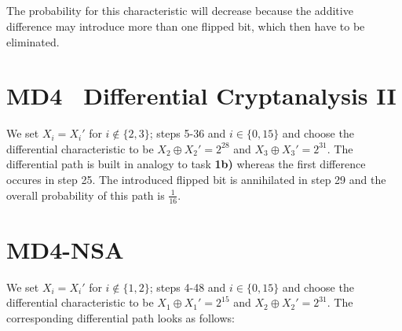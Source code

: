 \subsection{}
The probability for this characteristic will decrease because the additive difference may introduce more than one flipped bit, which then have to be eliminated.

\section{MD4 \textendash\ Differential Cryptanalysis II}
We set $X_i = X_i'$ for $i \notin \{2,3\}$; steps 5-36 and $i \in \{0,15\}$ and choose the differential characteristic to be $X_2 \oplus X_2' = 2^{28}$ and $X_3 \oplus X_3' = 2^{31}$. The differential path is built in analogy to task \textbf{1b)} whereas the first difference occures in step 25. The introduced flipped bit is annihilated in step 29 and the overall probability of this path is $\frac{1}{16}$.

\newpage

\section{MD4-NSA}
We set $X_i = X_i'$ for $i \notin \{1,2\}$; steps 4-48 and $i \in \{0,15\}$ and choose the differential characteristic to be $X_1 \oplus X_1' = 2^{15}$ and $X_2 \oplus X_2' = 2^{31}$. The corresponding differential path looks as follows:

